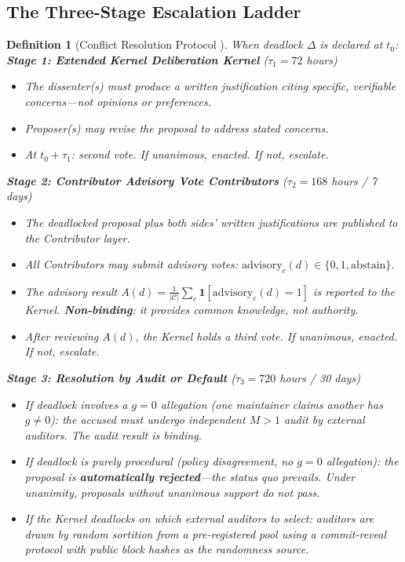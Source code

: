 \documentclass[12pt,a4paper]{article}
\newtheorem{definition}[theorem]{Definition}
\theoremstyle{definition}
\newcommand{\Contributors}{\mathcal{C}}
\newcommand{\ind}[1]{\mathbf{1}[#1]}
\newcommand{\gzero}{g=0}
\newcommand{\gnonzero}{g \neq 0}
\newcommand{\deadlockSym}{\Delta}
\begin{document}
\subsection{The Three-Stage Escalation Ladder}
\begin{definition}[Conflict Resolution Protocol ]
\label{def:conflict_protocol}
When deadlock $\deadlockSym$ is declared at $t_0$:
\medskip
\noindent\textbf{Stage 1: Extended Kernel Deliberation Kernel} ($\tau_1 = 72$ hours)
\begin{itemize}
    \item The dissenter(s) must produce a written justification citing specific, verifiable concerns---not opinions or preferences.
    \item Proposer(s) may revise the proposal to address stated concerns.
    \item At $t_0 + \tau_1$: second vote. If unanimous, enacted. If not, escalate.
\end{itemize}
\noindent\textbf{Stage 2: Contributor Advisory Vote Contributors} ($\tau_2 = 168$ hours / 7 days)
\begin{itemize}
    \item The deadlocked proposal plus both sides' written justifications are published to the Contributor layer.
    \item All Contributors may submit advisory votes: $\text{advisory}_c(d) \in \{0, 1, \text{abstain}\}$.
    \item The advisory result $A(d) = \frac{1}{|\Contributors|}\sum_c \ind{\text{advisory}_c(d) = 1}$ is reported to the Kernel. \textbf{Non-binding}: it provides common knowledge, not authority.
    \item After reviewing $A(d)$, the Kernel holds a third vote. If unanimous, enacted. If not, escalate.
\end{itemize}
\noindent\textbf{Stage 3: Resolution by Audit or Default} ($\tau_3 = 720$ hours / 30 days)
\begin{itemize}
    \item If deadlock involves a $\gzero$ allegation (one maintainer claims another has $\gnonzero$): the accused must undergo independent $M>1$ audit by external auditors. The audit result is binding.
    \item If deadlock is purely procedural (policy disagreement, no $\gzero$ allegation): the proposal is \textbf{automatically rejected}---the status quo prevails. Under unanimity, proposals without unanimous support do not pass.
    \item If the Kernel deadlocks on \textit{which} external auditors to select: auditors are drawn by random sortition from a pre-registered pool using a commit-reveal protocol with public block hashes as the randomness source.
\end{itemize}
\end{definition}
\end{document}
